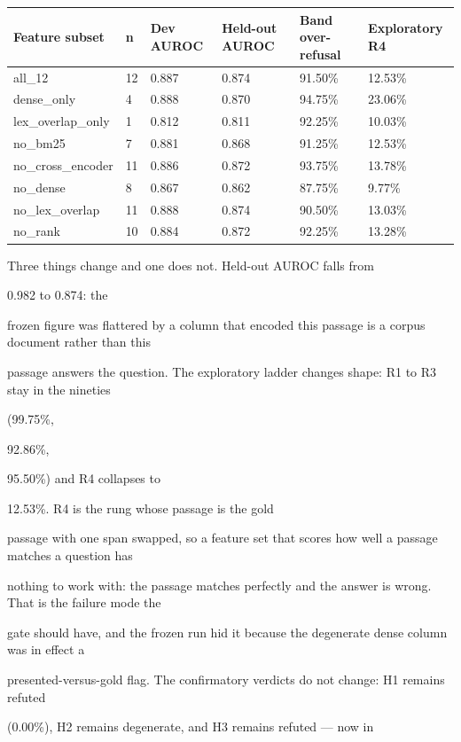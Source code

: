 \begin{table}[t]
\centering
\scriptsize
  \begin{tabularx}{\textwidth}{lXXXXX}
    \toprule
    Feature subset & n & Dev AUROC & Held-out AUROC & Band over-refusal & Exploratory R4 \\
\midrule
    all\_12 & 12 & 0.887 & 0.874 & 91.50\% & 12.53\% \\
    dense\_only & 4 & 0.888 & 0.870 & 94.75\% & 23.06\% \\
    lex\_overlap\_only & 1 & 0.812 & 0.811 & 92.25\% & 10.03\% \\
    no\_bm25 & 7 & 0.881 & 0.868 & 91.25\% & 12.53\% \\
    no\_cross\_encoder & 11 & 0.886 & 0.872 & 93.75\% & 13.78\% \\
    no\_dense & 8 & 0.867 & 0.862 & 87.75\% & 9.77\% \\
    no\_lex\_overlap & 11 & 0.888 & 0.874 & 90.50\% & 13.03\% \\
    no\_rank & 10 & 0.884 & 0.872 & 92.25\% & 13.28\% \\
    \bottomrule
  \end{tabularx}
\end{table}
Three things change and one does not. Held-out AUROC falls from

0.982 to 0.874: the

frozen figure was flattered by a column that encoded this passage is a corpus document rather than this

passage answers the question. The exploratory ladder changes shape: R1 to R3 stay in the nineties

(99.75\%,

92.86\%,

95.50\%) and R4 collapses to

12.53\%. R4 is the rung whose passage is the gold

passage with one span swapped, so a feature set that scores how well a passage matches a question has

nothing to work with: the passage matches perfectly and the answer is wrong. That is the failure mode the

gate should have, and the frozen run hid it because the degenerate dense column was in effect a

presented-versus-gold flag. The confirmatory verdicts do not change: H1 remains refuted

(0.00\%), H2 remains degenerate, and H3 remains refuted --- now in

